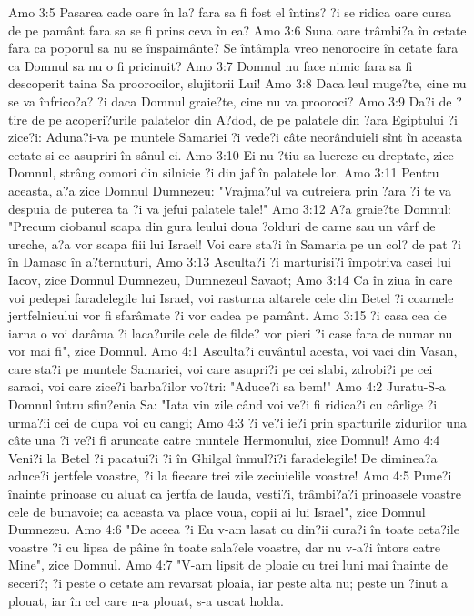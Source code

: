 Amo 3:5  Pasarea cade oare în la? fara sa fi fost el întins? ?i se ridica oare cursa de pe pamânt fara sa se fi prins ceva în ea?
Amo 3:6  Suna oare trâmbi?a în cetate fara ca poporul sa nu se înspaimânte? Se întâmpla vreo nenorocire în cetate fara ca Domnul sa nu o fi pricinuit?
Amo 3:7  Domnul nu face nimic fara sa fi descoperit taina Sa proorocilor, slujitorii Lui!
Amo 3:8  Daca leul muge?te, cine nu se va înfrico?a? ?i daca Domnul graie?te, cine nu va prooroci?
Amo 3:9  Da?i de ?tire de pe acoperi?urile palatelor din A?dod, de pe palatele din ?ara Egiptului ?i zice?i: Aduna?i-va pe muntele Samariei ?i vede?i câte neorânduieli sînt în aceasta cetate si ce asupriri în sânul ei.
Amo 3:10  Ei nu ?tiu sa lucreze cu dreptate, zice Domnul, strâng comori din silnicie ?i din jaf în palatele lor.
Amo 3:11  Pentru aceasta, a?a zice Domnul Dumnezeu: "Vrajma?ul va cutreiera prin ?ara ?i te va despuia de puterea ta ?i va jefui palatele tale!"
Amo 3:12  A?a graie?te Domnul: "Precum ciobanul scapa din gura leului doua ?olduri de carne sau un vârf de ureche, a?a vor scapa fiii lui Israel! Voi care sta?i în Samaria pe un col? de pat ?i în Damasc în a?ternuturi,
Amo 3:13  Asculta?i ?i marturisi?i împotriva casei lui Iacov, zice Domnul Dumnezeu, Dumnezeul Savaot;
Amo 3:14  Ca în ziua în care voi pedepsi faradelegile lui Israel, voi rasturna altarele cele din Betel ?i coarnele jertfelnicului vor fi sfarâmate ?i vor cadea pe pamânt.
Amo 3:15  ?i casa cea de iarna o voi darâma ?i laca?urile cele de filde? vor pieri ?i case fara de numar nu vor mai fi", zice Domnul.
Amo 4:1  Asculta?i cuvântul acesta, voi vaci din Vasan, care sta?i pe muntele Samariei, voi care asupri?i pe cei slabi, zdrobi?i pe cei saraci, voi care zice?i barba?ilor vo?tri: "Aduce?i sa bem!"
Amo 4:2  Juratu-S-a Domnul întru sfin?enia Sa: "Iata vin zile când voi ve?i fi ridica?i cu cârlige ?i urma?ii cei de dupa voi cu cangi;
Amo 4:3  ?i ve?i ie?i prin sparturile zidurilor una câte una ?i ve?i fi aruncate catre muntele Hermonului, zice Domnul!
Amo 4:4  Veni?i la Betel ?i pacatui?i ?i în Ghilgal înmul?i?i faradelegile! De diminea?a aduce?i jertfele voastre, ?i la fiecare trei zile zeciuielile voastre!
Amo 4:5  Pune?i înainte prinoase cu aluat ca jertfa de lauda, vesti?i, trâmbi?a?i prinoasele voastre cele de bunavoie; ca aceasta va place voua, copii ai lui Israel", zice Domnul Dumnezeu.
Amo 4:6  "De aceea ?i Eu v-am lasat cu din?ii cura?i în toate ceta?ile voastre ?i cu lipsa de pâine în toate sala?ele voastre, dar nu v-a?i întors catre Mine", zice Domnul.
Amo 4:7  "V-am lipsit de ploaie cu trei luni mai înainte de seceri?; ?i peste o cetate am revarsat ploaia, iar peste alta nu; peste un ?inut a plouat, iar în cel care n-a plouat, s-a uscat holda.
